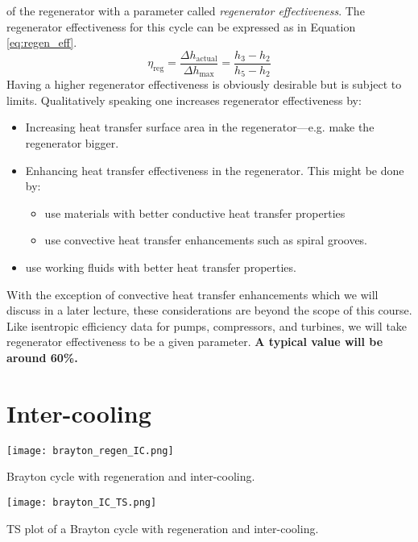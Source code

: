  of the regenerator with a parameter called \emph{regenerator effectiveness}.  The regenerator effectiveness for this cycle can be expressed as in Equation \ref{eq:regen_eff}.
\begin{equation}
\eta_{\text{reg}} = \frac{\Delta h_{\text{actual}}}{\Delta h_{\text{max}}} = \frac{h_3 - h_2}{h_5 - h_2}
\label{eq:regen_eff}
\end{equation}
Having a higher regenerator effectiveness is obviously desirable but is subject to limits.  Qualitatively speaking one increases regenerator effectiveness by:
\begin{itemize}
\item Increasing heat transfer surface area in the regenerator---e.g. make the regenerator bigger.
\item Enhancing heat transfer effectiveness in the regenerator. This might be done by:
\begin{itemize}
\item use materials with better conductive heat transfer properties
\item use convective heat transfer enhancements such as spiral grooves.  
\end{itemize}
\item use working fluids with better heat transfer properties.
\end{itemize}
With the exception of convective heat transfer enhancements which we will discuss in a later lecture, these considerations are beyond the scope of this course. Like isentropic efficiency data for pumps, compressors, and turbines, we will take regenerator effectiveness to be a given parameter.  \textbf{A typical value will be around 60\%.}

\section{Inter-cooling} 
\begin{marginfigure}
\texttt{[image: brayton\_regen\_IC.png]}
\caption{Brayton cycle with regeneration and inter-cooling.}
\label{fig:brayton_regen_IC}
\end{marginfigure}

\begin{marginfigure}
\texttt{[image: brayton\_IC\_TS.png]}
\caption{TS plot of a Brayton cycle with regeneration and inter-cooling.}
\label{fig:brayton_IC_TS}
\end{marginfigure}

